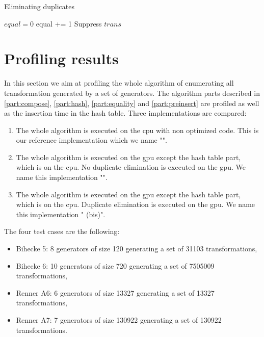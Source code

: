 {\begin{algorithm}
\caption{Eliminating duplicates}
\label{algo:preinsert}
\begin{algorithmic}
\STATE $equal = 0$
\STATE equal += 1
\ENDIF
\ENDFOR
{}
\STATE Suppress $trans$
\ENDIF
\ENDIF
\ENDFOR
\ENDFOR
\end{algorithmic}
\end{algorithm}


\section{Profiling results}
\label{part:results}
In this section we aim at profiling the whole algorithm of enumerating all transformation generated by a set of generators. 
The algorithm parts described in \autoref{part:compose}, \autoref{part:hash}, \autoref{part:equality} and \autoref{part:preinsert} are profiled as well as the insertion time in the hash table.
Three implementations are compared:
\begin{enumerate}
\item The whole algorithm is executed on the \gls{cpu} with non optimized code. This is our reference implementation which we name "". 
\item The whole algorithm is executed on the \gls{gpu} except the hash table part, which is on the \gls{cpu}. No duplicate elimination is executed on the \gls{gpu}.
We name this implementation "".
\item The whole algorithm is executed on the \gls{gpu} except the hash table part, which is on the \gls{cpu}. Duplicate elimination is executed on the \gls{gpu}.
We name this implementation " (bis)".
\end{enumerate}
The four test cases are the following:
\begin{itemize}
\item Bihecke 5: 8 generators of size 120 generating a set of 31103 transformations,
\item Bihecke 6: 10 generators of size 720 generating a set of 7505009 transformations,
\item Renner A6: 6 generators of size 13327 generating a set of 13327 transformations,
\item Renner A7: 7 generators of size 130922 generating a set of 130922 transformations.
\end{itemize}


}
